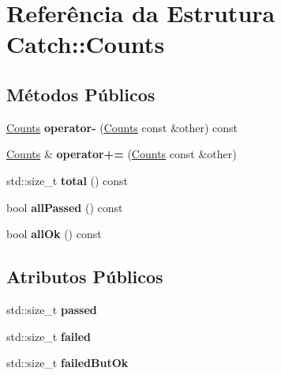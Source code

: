 \hypertarget{structCatch_1_1Counts}{}\section{Referência da Estrutura Catch\+:\+:Counts}
\label{structCatch_1_1Counts}
\subsection*{Métodos Públicos}
\begin{DoxyCompactItemize}
\item 
\hyperlink{structCatch_1_1Counts}{Counts} {\bfseries operator-\/} (\hyperlink{structCatch_1_1Counts}{Counts} const \&other) const \hypertarget{structCatch_1_1Counts_aedf86fefe33938d132a6981171cd83e6}{}\label{structCatch_1_1Counts_aedf86fefe33938d132a6981171cd83e6}

\item 
\hyperlink{structCatch_1_1Counts}{Counts} \& {\bfseries operator+=} (\hyperlink{structCatch_1_1Counts}{Counts} const \&other)\hypertarget{structCatch_1_1Counts_a322a89475cd2cc039140ef371e973677}{}\label{structCatch_1_1Counts_a322a89475cd2cc039140ef371e973677}

\item 
std\+::size\+\_\+t {\bfseries total} () const \hypertarget{structCatch_1_1Counts_a9125c662e30114e5c5cc94729b1e9e84}{}\label{structCatch_1_1Counts_a9125c662e30114e5c5cc94729b1e9e84}

\item 
bool {\bfseries all\+Passed} () const \hypertarget{structCatch_1_1Counts_adbbaca552f6017ce69e0d5dc5500bea4}{}\label{structCatch_1_1Counts_adbbaca552f6017ce69e0d5dc5500bea4}

\item 
bool {\bfseries all\+Ok} () const \hypertarget{structCatch_1_1Counts_ab2497c9dfc77be757a90225ea69595f5}{}\label{structCatch_1_1Counts_ab2497c9dfc77be757a90225ea69595f5}

\end{DoxyCompactItemize}
\subsection*{Atributos Públicos}
\begin{DoxyCompactItemize}
\item 
std\+::size\+\_\+t {\bfseries passed}\hypertarget{structCatch_1_1Counts_ad28daaf3de28006400208b6dd0c631e6}{}\label{structCatch_1_1Counts_ad28daaf3de28006400208b6dd0c631e6}

\item 
std\+::size\+\_\+t {\bfseries failed}\hypertarget{structCatch_1_1Counts_a19982a3817a3bc2c07f0290e71f497a3}{}\label{structCatch_1_1Counts_a19982a3817a3bc2c07f0290e71f497a3}

\item 
std\+::size\+\_\+t {\bfseries failed\+But\+Ok}\hypertarget{structCatch_1_1Counts_ac090973a2ff51394cd452718e75c073e}{}\label{structCatch_1_1Counts_ac090973a2ff51394cd452718e75c073e}

\end{DoxyCompactItemize}


